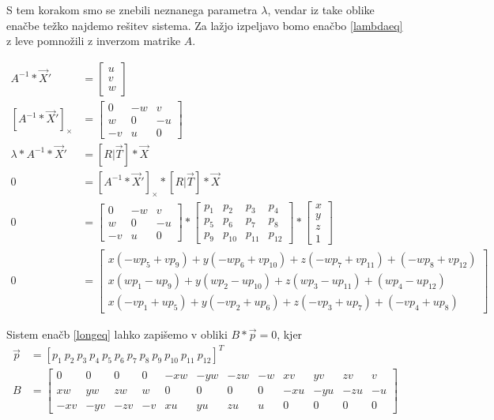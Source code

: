 \documentclass[a4paper, 12pt]{book}
\begin{document}
S tem korakom smo se znebili neznanega parametra $\lambda$, vendar iz take oblike enačbe težko najdemo rešitev sistema. Za lažjo izpeljavo bomo enačbo \eqref{lambdaeq} z leve pomnožili z inverzom matrike $A$.

\begin{align}
A^{-1} * \vec{X}' &=
\begin{bmatrix}
u \\
v \\
w
\end{bmatrix} \\
[A^{-1} * \vec{X}']_{\times} &=
\begin{bmatrix}
0 & -w & v \\
w & 0 & -u \\
-v & u & 0
\end{bmatrix} \\[5ex]
\lambda * A^{-1} * \vec{X}' &= [R | \vec{T}] * \vec{X} \\
0 &= [A^{-1} * \vec{X}']_{\times} * [R | \vec{T}] * \vec{X}\\
0 &= 
\begin{bmatrix}
0 & -w & v \\
w & 0 & -u \\
-v & u & 0
\end{bmatrix}
*
\begin{bmatrix}
p_1 & p_2 & p_3 & p_4 \\
p_5 & p_6 & p_7 & p_8 \\
p_9 & p_{10} & p_{11} & p_{12}
\end{bmatrix}
*
\begin{bmatrix}
x \\
y \\
z \\
1
\end{bmatrix} \\
0 &= 
\begin{bmatrix}
x(-wp_5 + vp_9) + y(-wp_6 + vp_{10}) + z(-wp_7 + vp_{11}) + (-wp_8 + vp_{12}) \\
x(wp_1 - up_9) + y(wp_2 - up_{10}) + z(wp_3 - up_{11}) + (wp_4 - up_{12}) \\
x(-vp_1 + up_5) + y(-vp_2 + up_6) + z(-vp_3 + up_7) + (-vp_4 + up_8)
\end{bmatrix}
\label{longeq}
\end{align}

\setcounter{MaxMatrixCols}{20}
Sistem enačb \eqref{longeq} lahko zapišemo v obliki $B * \vec{p} = 0$, kjer
\begin{align}
\vec{p} &= [p_1 \ p_2 \ p_3 \ p_4 \ p_5 \ p_6 \ p_7 \ p_8 \ p_9 \ p_{10} \ p_{11} \ p_{12}]^T \\
B &=
\begin{bmatrix}
0 & 0 & 0 & 0 & -xw & -yw & -zw & -w & xv & yv & zv & v \\
xw & yw & zw & w & 0 & 0 & 0 & 0 & -xu & -yu & -zu & -u \\
-xv & -yv & -zv & -v & xu & yu & zu & u & 0 & 0 & 0 & 0
\end{bmatrix}
\end{align}
\end{document}
